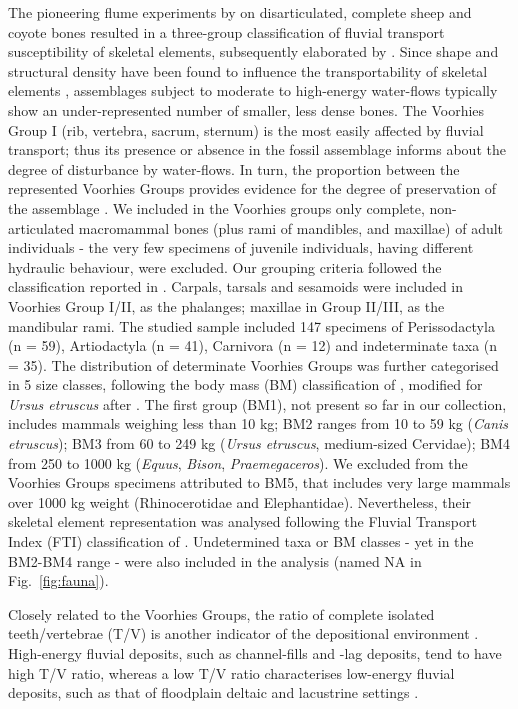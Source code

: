 \documentclass[review,times,authoryear]{elsarticle} %
\begin{document}
The pioneering flume experiments by \cite{Voorhies1969} on disarticulated, complete sheep and coyote bones resulted in a three-group classification of fluvial transport susceptibility of skeletal elements, subsequently elaborated by \cite{Behrensmeyer1975a}. Since shape and structural density have been found to influence the transportability of skeletal elements \citep{Behrensmeyer1975a,Boaz1982}, assemblages subject to moderate to high-energy water-flows typically show an under-represented number of smaller, less dense bones. The Voorhies Group I (rib, vertebra, sacrum, sternum) is the most easily affected by fluvial transport; thus its presence or absence in the fossil assemblage informs about the degree of disturbance by water-flows. In turn, the proportion between the represented Voorhies Groups provides evidence for the degree of preservation of the assemblage \citep{Behrensmeyer1975a}. We included in the Voorhies groups only complete, non-articulated macromammal bones (plus rami of mandibles, and maxillae) of adult individuals - the very few specimens of juvenile individuals, having different hydraulic behaviour, were excluded. Our grouping criteria followed the classification reported in \citet[][Tab.6.5]{Lyman1994}. Carpals, tarsals and sesamoids were included in Voorhies Group I/II, as the phalanges; maxillae in Group II/III, as the mandibular rami. The studied sample included 147 specimens of Perissodactyla (n = 59), Artiodactyla (n = 41), Carnivora (n = 12) and indeterminate taxa (n = 35). The distribution of determinate Voorhies Groups was further categorised in 5 size classes, following the body mass (BM) classification of \cite{Palombo2010,Palombo2016}, modified for \emph{Ursus etruscus} after \cite{Koufos}. The first group (BM1), not present so far in our collection, includes mammals weighing less than 10 kg; BM2 ranges from 10 to 59 kg (\emph{Canis etruscus}); BM3 from 60 to 249 kg (\emph{Ursus etruscus}, medium-sized Cervidae); BM4 from 250 to 1000 kg (\emph{Equus}, \emph{Bison}, \emph{Praemegaceros}). We excluded from the Voorhies Groups specimens attributed to BM5, that includes very large mammals over 1000 kg weight (Rhinocerotidae and Elephantidae). Nevertheless, their skeletal element representation was analysed following the Fluvial Transport Index (FTI) classification of \cite{Frison1986}. Undetermined taxa or BM classes - yet in the BM2-BM4 range - were also included in the analysis (named NA in Fig.~\ref{fig:fauna}).

Closely related to the Voorhies Groups, the ratio of complete isolated teeth/vertebrae (T/V) is another indicator of the depositional environment \citep{Behrensmeyer1975a}. High-energy fluvial deposits, such as channel-fills and -lag deposits, tend to have high T/V ratio, whereas a low T/V ratio characterises low-energy fluvial deposits, such as that of floodplain deltaic and lacustrine settings \citep{Lyman1994}.
\end{document}
